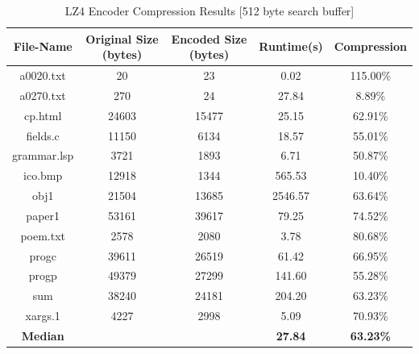 \documentclass[12pt]{article}
\begin{document}
\begin{table}[H]
	\centering
	\begin{tabular}{| c | c | c | c | c |} 
		\hline
		File-Name & Original Size (bytes) & Encoded Size (bytes) & Runtime(s) & Compression\\
		\hline
		a0020.txt & 20 & 23 & 0.02 & 115.00\%\\
		\hline
		a0270.txt & 270 & 24 & 27.84 & 8.89\%\\
		\hline
		cp.html & 24603 & 15477 & 25.15 & 62.91\%\\
		\hline
		fields.c & 11150 & 6134 & 18.57 & 55.01\%\\
		\hline
		grammar.lsp & 3721 & 1893 & 6.71 & 50.87\%\\
		\hline
		ico.bmp & 12918 & 1344 & 565.53 & 10.40\%\\
		\hline
		obj1 & 21504 & 13685 & 2546.57 & 63.64\%\\
		\hline
		paper1 & 53161 & 39617 & 79.25 & 74.52\%\\
		\hline
		poem.txt & 2578 & 2080 & 3.78 & 80.68\%\\
		\hline
		progc & 39611 & 26519 & 61.42 & 66.95\%\\
		\hline
		progp & 49379 & 27299 & 141.60 & 55.28\%\\
		\hline
		sum & 38240 & 24181 & 204.20 & 63.23\%\\
		\hline
		xargs.1 & 4227 & 2998 & 5.09 & 70.93\%\\
		\Xhline{3\arrayrulewidth}
		\textbf{Median} & & & \textbf{27.84} & \textbf{63.23\%}\\
		\hline
	\end{tabular}
	\caption{LZ4 Encoder Compression Results [512 byte search buffer]}
	\label{lz4_enc_results512}
\end{table}
\end{document}
